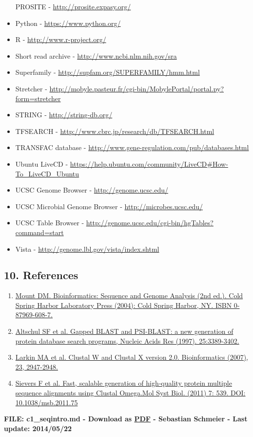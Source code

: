 \documentclass[]{article}
\begin{document}
\begin{itemize}
  PROSITE - \url{http://prosite.expasy.org/}
\item
  Python - \url{https://www.python.org/}
\item
  R - \url{http://www.r-project.org/}
\item
  Short read archive - \url{http://www.ncbi.nlm.nih.gov/sra}
\item
  Superfamily - \url{http://supfam.org/SUPERFAMILY/hmm.html}
\item
  Stretcher -
  \url{http://mobyle.pasteur.fr/cgi-bin/MobylePortal/portal.py?form=stretcher}
\item
  STRING - \url{http://string-db.org/}
\item
  TFSEARCH - \url{http://www.cbrc.jp/research/db/TFSEARCH.html}
\item
  TRANSFAC database -
  \url{http://www.gene-regulation.com/pub/databases.html}
\item
  Ubuntu LiveCD -
  \url{https://help.ubuntu.com/community/LiveCD\#How-To_LiveCD_Ubuntu}
\item
  UCSC Genome Browser - \url{http://genome.ucsc.edu/}
\item
  UCSC Microbial Genome Browser - \url{http://microbes.ucsc.edu/}
\item
  UCSC Table Browser -
  \url{http://genome.ucsc.edu/cgi-bin/hgTables?command=start}
\item
  Vista - \url{http://genome.lbl.gov/vista/index.shtml}
\end{itemize}

\subsection{10. References}\label{references}

\begin{enumerate}
\def\labelenumi{\arabic{enumi}.}
\itemsep1pt\parskip0pt
\item
  \href{http://www.cshlpress.com/default.tpl?cart=14004538673655488\&fromlink=T\&linkaction=full\&linksortby=oop_title\&--eqSKUdatarq=466}{Mount
  DM. Bioinformatics: Sequence and Genome Analysis (2nd ed.). Cold
  Spring Harbor Laboratory Press (2004): Cold Spring Harbor, NY. ISBN
  0-87969-608-7.}
\item
  \href{http://www.ncbi.nlm.nih.gov/pubmed/?term=9254694}{Altschul SF et
  al. Gapped BLAST and PSI-BLAST: a new generation of protein database
  search programs, Nucleic Acids Res (1997). 25:3389-3402.}
\item
  \href{http://www.ncbi.nlm.nih.gov/pubmed/17846036}{Larkin MA et al.
  Clustal W and Clustal X version 2.0. Bioinformatics (2007), 23,
  2947-2948.}
\item
  \href{http://msb.embopress.org/content/7/1/539}{Sievers F et al. Fast,
  scalable generation of high‐quality protein multiple sequence
  alignments using Clustal Omega.Mol Syst Biol. (2011) 7: 539. DOI:
  10.1038/msb.2011.75}
\end{enumerate}

\textbf{FILE: c1\_seqintro.md - Download as
\href{http://compbio.massey.ac.nz/wiki/data/c1/doc/c1_seqintro.pdf}{PDF}
- Sebastian Schmeier - Last update: 2014/05/22}
\end{document}
